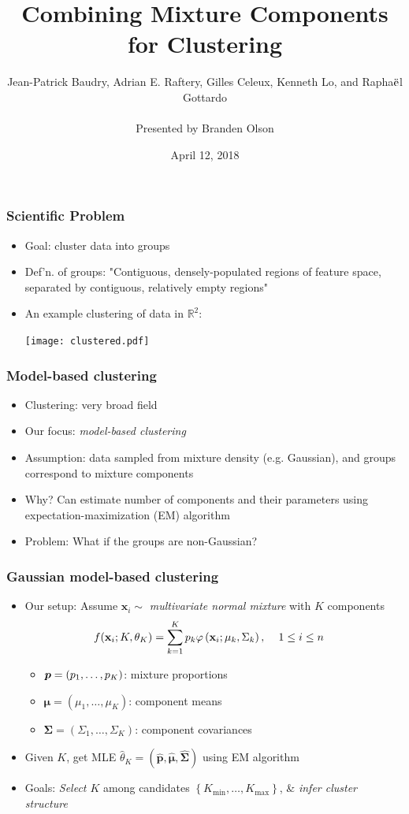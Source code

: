 \documentclass[mathserif,compress]{beamer}
\title[]{Combining Mixture Components for Clustering}
\author[]
{Jean-Patrick Baudry, Adrian E. Raftery, Gilles Celeux, Kenneth Lo, and Rapha$\ddot{\text e}$l Gottardo\\$\;$ \\Presented by Branden Olson}
\date[April, 2018]
{April 12, 2018}
\institute[]
{
}
\newcommand*\reals{\mathbb{R}}
\newcommand*\htab{\hspace{4 mm}}
\newcommand*\ba{\[ \begin{aligned}}
\newcommand*\ea{\end{aligned} \]}
\newcommand*\set[1]{\left\{#1\right\}}
\newcommand*\estim[1]{\widehat{#1}}
\renewcommand\;{\,}
\renewcommand\phi{\varphi}
\newcommand{\bx}{\mathbf{x}}
\newcommand{\bp}{\mbox{\protect\boldmath $p$}}
\begin{document}
\begin{frame}[noframenumbering]
  \titlepage
\end{frame}

\begin{frame}\frametitle{Scientific Problem}
\begin{itemize}
\item[]
\alert{Goal:} cluster data into groups
\medskip
\item[]
\alert{Def'n. of groups}: "Contiguous, densely-populated regions of feature space, separated by contiguous, relatively empty regions"
\medskip
\item[]
An example clustering of data in $\reals^2$:
\smallskip
\begin{center}
\texttt{[image: clustered.pdf]}
\end{center}
\end{itemize}
\end{frame}

\begin{frame}\frametitle{Model-based clustering}
\begin{itemize}
\item[]
\alert{Clustering:} very broad field
\bigskip
\item[]
\alert{Our focus:} \emph{model-based clustering}
\bigskip
\item[]
\alert{Assumption:} data sampled from mixture density (e.g. Gaussian), and groups correspond to mixture components
\bigskip
\item[]
\alert{Why?} Can estimate number of components and their parameters using expectation-maximization (EM) algorithm
\bigskip
\item[]
\alert{Problem:} What if the groups are non-Gaussian?
\end{itemize}
\end{frame}

\begin{frame}\frametitle{Gaussian model-based clustering}
\begin{itemize}
\item[]
\alert{Our setup:} Assume $\bx_i \sim$ \emph{multivariate normal mixture} with $K$ components
\ba
f(\bx_i ; K, \theta_K) 
	& = \sum_{k=1}^K p_k
		\phi \left(\bx_i ; \mu_k, \Sigma_k\right),
		\htab
		1 \le i \le n
\ea
\begin{itemize}
\item
$\bp = (p_1, \dotsc, p_K)$: mixture proportions
\medskip
\item
$\pmb\mu = (\mu_1, \dotsc, \mu_K)$: component means
\medskip
\item
$\pmb\Sigma = (\Sigma_1, \dotsc, \Sigma_K)$: component covariances
\end{itemize}
\bigskip
\item[]
Given $K$, get MLE 
$\estim\theta_K = (\estim{\mathbf p}, \estim{\pmb\mu}, \estim{\pmb\Sigma})$ using EM algorithm
\bigskip
\item[]
\alert{Goals:} \emph{Select $K$} among candidates $\set{K_\text{min}, \dotsc, K_\text{max}}$,  \& \emph{infer cluster structure}
\medskip
\end{itemize}
\end{frame}
\end{document}
